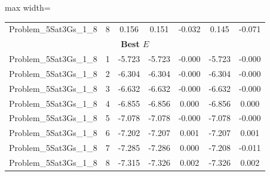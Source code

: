 \begin{table}[!htbp]
\begin{adjustbox}{max width=\columnwidth}
\begin{tabularx}{\columnwidth}{c|c c c c c c}
            Problem\_5Sat3Gs\_1\_8 & 8 & 0.156 & 0.151 & -0.032 & 0.145 & -0.071 \\
            \multicolumn{7}{c}{\textbf{Best $E$}} \\ \midrule
            Problem\_5Sat3Gs\_1\_8 & 1 & -5.723 & -5.723 & -0.000 & -5.723 & -0.000 \\
            Problem\_5Sat3Gs\_1\_8 & 2 & -6.304 & -6.304 & -0.000 & -6.304 & -0.000 \\
            Problem\_5Sat3Gs\_1\_8 & 3 & -6.632 & -6.632 & -0.000 & -6.632 & -0.000 \\
            Problem\_5Sat3Gs\_1\_8 & 4 & -6.855 & -6.856 & 0.000 & -6.856 & 0.000 \\
            Problem\_5Sat3Gs\_1\_8 & 5 & -7.078 & -7.078 & -0.000 & -7.078 & -0.000 \\
            Problem\_5Sat3Gs\_1\_8 & 6 & -7.202 & -7.207 & 0.001 & -7.207 & 0.001 \\
            Problem\_5Sat3Gs\_1\_8 & 7 & -7.285 & -7.286 & 0.000 & -7.208 & -0.011 \\
            Problem\_5Sat3Gs\_1\_8 & 8 & -7.315 & -7.326 & 0.002 & -7.326 & 0.002 \\
            \bottomrule
        \end{tabularx}
    \end{adjustbox}
\end{table}
